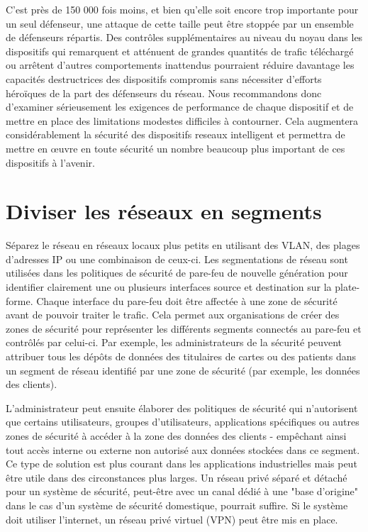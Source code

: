 \documentclass[12pt]{report}
\begin{document}
C'est près de 150 000 fois moins, et bien qu'elle soit encore
trop importante pour un seul défenseur, une attaque de cette taille peut
être stoppée par un ensemble de défenseurs répartis. Des contrôles
supplémentaires au niveau du noyau dans les dispositifs qui remarquent
et atténuent de grandes quantités de trafic téléchargé ou arrêtent
d'autres comportements inattendus pourraient réduire davantage les
capacités destructrices des dispositifs compromis sans nécessiter
d'efforts héroïques de la part des défenseurs du réseau. Nous
recommandons donc d'examiner sérieusement les exigences de performance
de chaque dispositif et de mettre en place des limitations modestes
difficiles à contourner. Cela augmentera considérablement la sécurité
des dispositifs reseaux intelligent et permettra de mettre en œuvre en toute sécurité un
nombre beaucoup plus important de ces dispositifs à l'avenir.

\hypertarget{diviser-les-ruxe9seaux-en-segments}{%
      \section{\texorpdfstring{Diviser les réseaux en segments
        }{Diviser les réseaux en segments }}\label{diviser-les-ruxe9seaux-en-segments}}

Séparez le réseau en réseaux locaux plus petits en utilisant des VLAN,
des plages d'adresses IP ou une combinaison de ceux-ci. Les
segmentations de réseau sont utilisées dans les politiques de sécurité
de pare-feu de nouvelle génération pour identifier clairement une ou
plusieurs interfaces source et destination sur la plate-forme. Chaque
interface du pare-feu doit être affectée à une zone de sécurité avant de
pouvoir traiter le trafic. Cela permet aux organisations de créer des
zones de sécurité pour représenter les différents segments connectés au
pare-feu et contrôlés par celui-ci. Par exemple, les administrateurs de
la sécurité peuvent attribuer tous les dépôts de données des titulaires
de cartes ou des patients dans un segment de réseau identifié par une
zone de sécurité (par exemple, les données des clients).

L'administrateur peut ensuite élaborer des politiques de sécurité qui
n'autorisent que certains utilisateurs, groupes d'utilisateurs,
applications spécifiques ou autres zones de sécurité à accéder à la zone
des données des clients - empêchant ainsi tout accès interne ou externe
non autorisé aux données stockées dans ce segment. Ce type de solution
est plus courant dans les applications industrielles mais peut être
utile dans des circonstances plus larges. Un réseau privé séparé et
détaché pour un système de sécurité, peut-être avec un canal dédié à une
"base d'origine" dans le cas d'un système de sécurité domestique,
pourrait suffire. Si le système doit utiliser l'internet, un réseau
privé virtuel (VPN) peut être mis en place.
\end{document}

